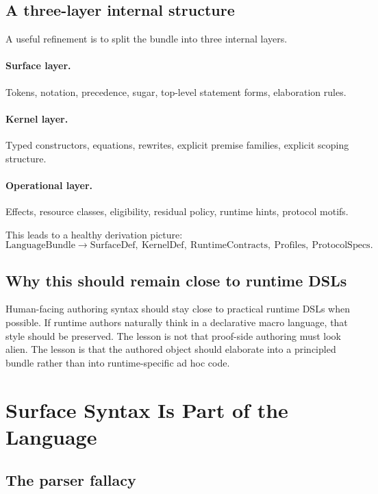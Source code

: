 \documentclass[11pt]{article}
\begin{document}
\subsection{A three-layer internal structure}

A useful refinement is to split the bundle into three internal layers.

\paragraph{Surface layer.}
Tokens, notation, precedence, sugar, top-level statement forms, elaboration rules.

\paragraph{Kernel layer.}
Typed constructors, equations, rewrites, explicit premise families, explicit scoping structure.

\paragraph{Operational layer.}
Effects, resource classes, eligibility, residual policy, runtime hints, protocol motifs.

This leads to a healthy derivation picture:
\[
\text{LanguageBundle} \longrightarrow \text{SurfaceDef},\ \text{KernelDef},\ \text{RuntimeContracts},\ \text{Profiles},\ \text{ProtocolSpecs}.
\]

\subsection{Why this should remain close to runtime DSLs}

Human-facing authoring syntax should stay close to practical runtime DSLs when possible. If runtime authors naturally think in a declarative macro language, that style should be preserved. The lesson is not that proof-side authoring must look alien. The lesson is that the authored object should elaborate into a principled bundle rather than into runtime-specific ad hoc code.

\section{Surface Syntax Is Part of the Language}

\subsection{The parser fallacy}
\end{document}
